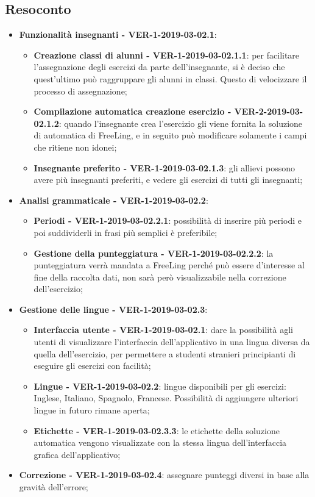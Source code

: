 \documentclass[a4paper, oneside, openany, dvipsnames, table]{article}
\begin{document}
\subsection{Resoconto}
\begin{itemize}
	\item \textbf{Funzionalità insegnanti - VER-1-2019-03-02.1}: 
	\begin{itemize}
		\item \textbf{Creazione classi di alunni - VER-1-2019-03-02.1.1}: per facilitare l'assegnazione degli esercizi da parte dell'insegnante,
		 si è deciso che quest'ultimo può raggruppare gli alunni in classi. Questo di velocizzare
		il processo di assegnazione;
		\item \textbf{Compilazione automatica creazione esercizio - VER-2-2019-03-02.1.2}:
		quando l'insegnante crea l'esercizio gli viene fornita la soluzione di automatica di FreeLing,
		e in seguito può modificare solamente i campi che ritiene non idonei;
		\item \textbf{Insegnante preferito - VER-1-2019-03-02.1.3}: 
		gli allievi possono avere più insegnanti preferiti, e vedere gli esercizi di tutti gli insegnanti;
	\end{itemize}
	\item \textbf{Analisi grammaticale - VER-1-2019-03-02.2}:
	\begin{itemize}
		\item \textbf{Periodi - VER-1-2019-03-02.2.1}: possibilità di inserire più periodi e poi suddividerli in frasi più semplici è preferibile;
		\item \textbf{Gestione della punteggiatura - VER-1-2019-03-02.2.2}: la punteggiatura verrà mandata a FreeLing perché 
		può essere d'interesse al fine della raccolta dati, non sarà però visualizzabile nella correzione dell'esercizio;
	\end{itemize}
	\item \textbf{Gestione delle lingue - VER-1-2019-03-02.3}: 
	\begin{itemize}
		\item \textbf{Interfaccia utente - VER-1-2019-03-02.1}: dare la possibilità agli utenti di visualizzare l'interfaccia dell'applicativo in una lingua diversa da quella dell'esercizio,
		per permettere a studenti stranieri principianti di eseguire gli esercizi con facilità;
		\item \textbf{Lingue - VER-1-2019-03-02.2}: lingue disponibili per gli esercizi: 
		Inglese, Italiano, Spagnolo, Francese. Possibilità di aggiungere ulteriori lingue in futuro rimane aperta;
		\item \textbf{Etichette - VER-1-2019-03-02.3.3}: le etichette della soluzione automatica
		vengono visualizzate con la stessa lingua dell'interfaccia grafica dell'applicativo;
	\end{itemize}
	\item \textbf{Correzione - VER-1-2019-03-02.4}:
	assegnare punteggi diversi in base alla gravità dell'errore;
	

\end{itemize}
\end{document}
